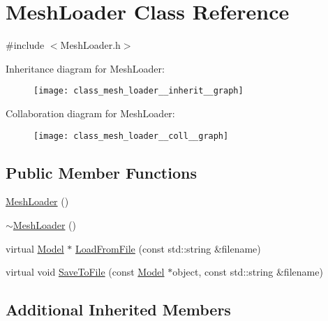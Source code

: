 \hypertarget{class_mesh_loader}{\section{Mesh\+Loader Class Reference}
\label{class_mesh_loader}
}


{\ttfamily \#include $<$Mesh\+Loader.\+h$>$}



Inheritance diagram for Mesh\+Loader\+:\nopagebreak
\begin{figure}[H]
\begin{center}
\leavevmode
\texttt{[image: class\_mesh\_loader\_\_inherit\_\_graph]}
\end{center}
\end{figure}


Collaboration diagram for Mesh\+Loader\+:\nopagebreak
\begin{figure}[H]
\begin{center}
\leavevmode
\texttt{[image: class\_mesh\_loader\_\_coll\_\_graph]}
\end{center}
\end{figure}
\subsection*{Public Member Functions}
\begin{DoxyCompactItemize}
\item 
\hyperlink{class_mesh_loader_a3dfe18053d07cfe24f6e55cd610658b8}{Mesh\+Loader} ()
\item 
\hyperlink{class_mesh_loader_a4cfe76415e6ec9db3895450e043b77ff}{$\sim$\+Mesh\+Loader} ()
\item 
virtual \hyperlink{class_agmd_1_1_model}{Model} $\ast$ \hyperlink{class_mesh_loader_a895bf275dc410e869d1616243847d60f}{Load\+From\+File} (const std\+::string \&filename)
\item 
virtual void \hyperlink{class_mesh_loader_abab08be2eb32b87f978b6773baba8182}{Save\+To\+File} (const \hyperlink{class_agmd_1_1_model}{Model} $\ast$object, const std\+::string \&filename)
\end{DoxyCompactItemize}
\subsection*{Additional Inherited Members}


